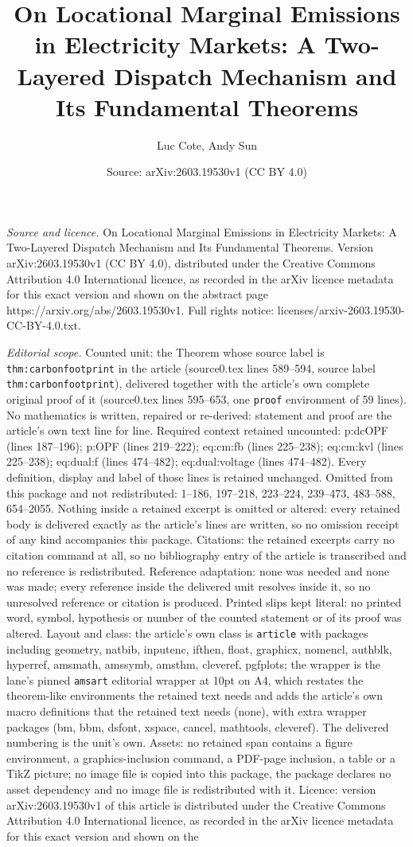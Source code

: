 \documentclass[10pt,a4paper]{amsart}
\title[On Locational Marginal Emissions in Electricity Markets: A T]{On Locational Marginal Emissions in Electricity Markets: A Two-Layered Dispatch Mechanism and Its Fundamental Theorems}
\author{Luc Cote, Andy Sun}
\date{Source: arXiv:2603.19530v1 (CC BY 4.0)}
\begin{document}
\maketitle

\noindent\emph{Source and licence.} On Locational Marginal Emissions in Electricity Markets: A Two-Layered Dispatch Mechanism and Its Fundamental Theorems. Version arXiv:2603.19530v1 (CC BY 4.0), distributed under the Creative Commons Attribution 4.0 International licence, as recorded in the arXiv licence metadata for this exact version and shown on the abstract page https://arxiv.org/abs/2603.19530v1. Full rights notice: licenses/arxiv-2603.19530-CC-BY-4.0.txt.\par\smallskip

\noindent\textit{Editorial scope.} Counted unit: the Theorem whose source label is \texttt{thm:carbonfootprint} in the article (source0.tex lines 589--594, source label \texttt{thm:carbonfootprint}), delivered together with the article's own complete original proof of it (source0.tex lines 595--653, one \texttt{proof} environment of 59 lines). No mathematics is written, repaired or re-derived: statement and proof are the article's own text line for line. Required context retained uncounted: p:dcOPF (lines 187--196); p:OPF (lines 219--222); eq:cm:fb (lines 225--238); eq:cm:kvl (lines 225--238); eq:dual:f (lines 474--482); eq:dual:voltage (lines 474--482). Every definition, display and label of those lines is retained unchanged. Omitted from this package and not redistributed: 1--186, 197--218, 223--224, 239--473, 483--588, 654--2055. Nothing inside a retained excerpt is omitted or altered: every retained body is delivered exactly as the article's lines are written, so no omission receipt of any kind accompanies this package. Citations: the retained excerpts carry no citation command at all, so no bibliography entry of the article is transcribed and no reference is redistributed. Reference adaptation: none was needed and none was made; every reference inside the delivered unit resolves inside it, so no unresolved reference or citation is produced. Printed slips kept literal: no printed word, symbol, hypothesis or number of the counted statement or of its proof was altered. Layout and class: the article's own class is \texttt{article} with packages including geometry, natbib, inputenc, ifthen, float, graphicx, nomencl, authblk, hyperref, amsmath, amssymb, amsthm, cleveref, pgfplots; the wrapper is the lane's pinned \texttt{amsart} editorial wrapper at 10pt on A4, which restates the theorem-like environments the retained text needs and adds the article's own macro definitions that the retained text needs (none), with extra wrapper packages (bm, bbm, dsfont, xspace, cancel, mathtools, cleveref). The delivered numbering is the unit's own. Assets: no retained span contains a figure environment, a graphics-inclusion command, a PDF-page inclusion, a table or a TikZ picture; no image file is copied into this package, the package declares no asset dependency and no image file is redistributed with it. Licence: version arXiv:2603.19530v1 of this article is distributed under the Creative Commons Attribution 4.0 International licence, as recorded in the arXiv licence metadata for this exact version and shown on the 
\end{document}
